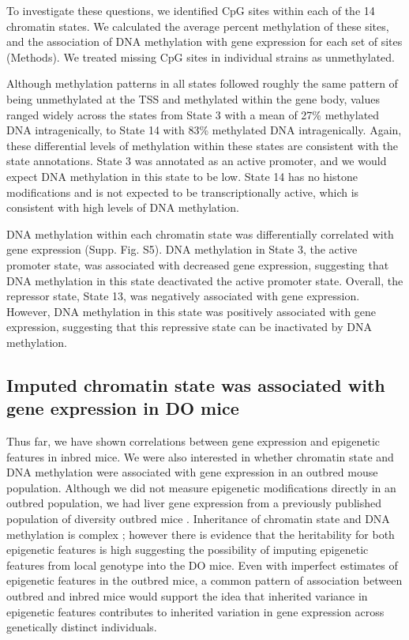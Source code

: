 \documentclass[
  11pt,
]{article}
\begin{document}
To investigate these questions, we identified CpG sites within each of
the 14 chromatin states. We calculated the average percent methylation
of these sites, and the association of DNA methylation with gene
expression for each set of sites (Methods). We treated missing CpG sites
in individual strains as unmethylated.

Although methylation patterns in all states followed roughly the same
pattern of being unmethylated at the TSS and methylated within the gene
body, values ranged widely across the states from State 3 with a mean of
27\% methylated DNA intragenically, to State 14 with 83\% methylated DNA
intragenically. Again, these differential levels of methylation within
these states are consistent with the state annotations. State 3 was
annotated as an active promoter, and we would expect DNA methylation in
this state to be low. State 14 has no histone modifications and is not
expected to be transcriptionally active, which is consistent with high
levels of DNA methylation.

DNA methylation within each chromatin state was differentially
correlated with gene expression (Supp. Fig. S5). DNA methylation in
State 3, the active promoter state, was associated with decreased gene
expression, suggesting that DNA methylation in this state deactivated
the active promoter state. Overall, the repressor state, State 13, was
negatively associated with gene expression. However, DNA methylation in
this state was positively associated with gene expression, suggesting
that this repressive state can be inactivated by DNA methylation.

\hypertarget{imputed-chromatin-state-was-associated-with-gene-expression-in-do-mice}{%
\subsection{Imputed chromatin state was associated with gene expression
in DO
mice}\label{imputed-chromatin-state-was-associated-with-gene-expression-in-do-mice}}

Thus far, we have shown correlations between gene expression and
epigenetic features in inbred mice. We were also interested in whether
chromatin state and DNA methylation were associated with gene expression
in an outbred mouse population. Although we did not measure epigenetic
modifications directly in an outbred population, we had liver gene
expression from a previously published population of diversity outbred
mice \citep{pmid28592500}. Inheritance of chromatin state and DNA
methylation is complex \citep{rintisch2014natural}; however there is
evidence that the heritability for both epigenetic features is high
\citep{pmid16009939,pmid33931130} suggesting the possibility of imputing
epigenetic features from local genotype into the DO mice. Even with
imperfect estimates of epigenetic features in the outbred mice, a common
pattern of association between outbred and inbred mice would support the
idea that inherited variance in epigenetic features contributes to
inherited variation in gene expression across genetically distinct
individuals.
\end{document}
